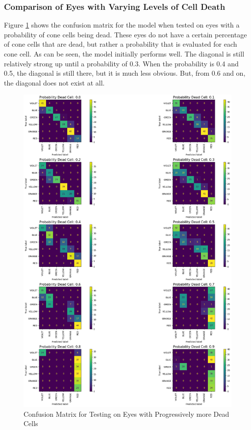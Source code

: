 \documentclass[titlepage]{article}
\begin{document}
\subsubsection{Comparison of Eyes with Varying Levels of Cell Death}

Figure \ref{fig:dead_cell_confusion_matrix} shows the confusion matrix for the model when tested on eyes with a probability of cone cells being dead. These eyes do not have a certain percentage of cone cells that are dead, but rather a probability that is evaluated for each cone cell. As can be seen, the model initially performs well. The diagonal is still relatively strong up until a probability of 0.3. When the probability is 0.4 and 0.5, the diagonal is still there, but it is much less obvious. But, from 0.6 and on, the diagonal does not exist at all.

\begin{figure}
    \centering
    \includegraphics[width=\textwidth]{figs/dead_cell_confusion_matrix.png}
    \caption{Confusion Matrix for Testing on Eyes with Progressively more Dead Cells}
    \label{fig:dead_cell_confusion_matrix}
\end{figure}
\end{document}
